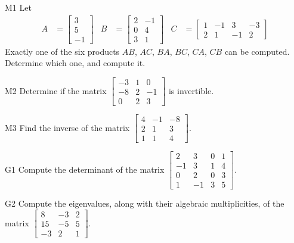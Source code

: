 \documentclass{sbgLAsemi}
\begin{document}
\begin{problem}{M1}
Let
\begin{align*}
A &= \begin{bmatrix} 3 \\ 5 \\ -1  \end{bmatrix} & B &= \begin{bmatrix} 2 & -1 \\ 0 & 4 \\ 3 & 1 \end{bmatrix} & C&=\begin{bmatrix} 1 & -1 & 3 & -3 \\ 2 & 1 & -1 & 2 \end{bmatrix}
\end{align*}
Exactly one of the six products $AB$, $AC$, $BA$, $BC$, $CA$, $CB$ can be computed.  Determine which one, and compute it.
\end{problem}

\begin{problem}{M2}
Determine if the matrix $\begin{bmatrix}-3 & 1 & 0 \\ -8 & 2 & -1 \\ 0 & 2 & 3\end{bmatrix}$ is invertible.
\end{problem}

\begin{problem}{M3}
  Find the inverse of the matrix
  \(\begin{bmatrix}
    4 & -1 & -8  \\
    2 & 1 & 3  \\
    1 & 1 & 4
  \end{bmatrix}\).
\end{problem}

\begin{problem}{G1}
Compute the determinant of the matrix $\begin{bmatrix} 2 & 3 & 0 & 1 \\ -1 & 3 & 1 & 4 \\ 0 & 2 & 0 & 3 \\ 1 & -1 & 3 & 5 \end{bmatrix}$.
\end{problem}

\begin{problem}{G2}
Compute the eigenvalues, along with their algebraic multiplicities, of the matrix $ \begin{bmatrix} 8 & -3 & 2 \\ 15 & -5 & 5 \\ -3 & 2 & 1 \end{bmatrix}$.
\end{problem}
\end{document}
